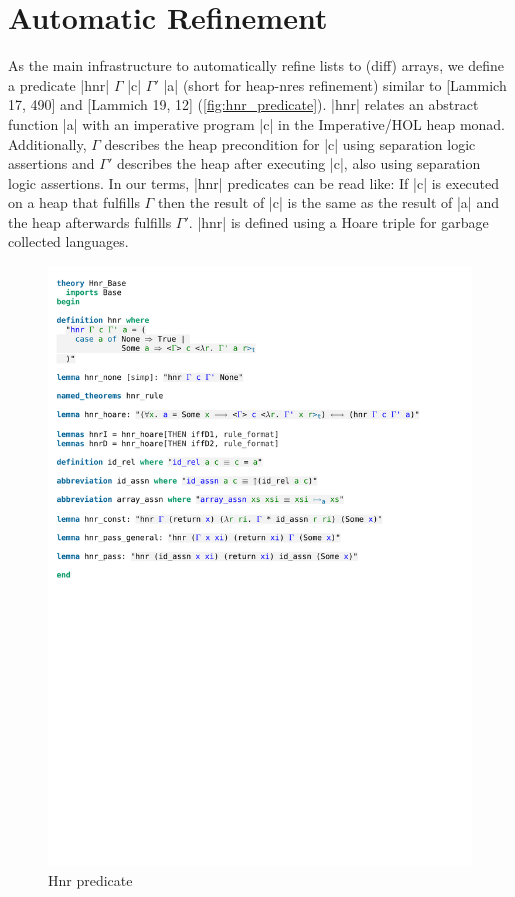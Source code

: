 \chapter{Automatic Refinement}\label{chapter:automatic-refinement}

As the main infrastructure to automatically refine lists to (diff) arrays, we define a predicate |hnr| $\Gamma$ |c| $\Gamma'$ |a| (short for heap-nres refinement) similar to [Lammich 17, 490] and [Lammich 19, 12] (\autoref{fig:hnr_predicate}). |hnr| relates an abstract function |a| with an imperative program |c| in the Imperative/HOL heap monad. Additionally, $\Gamma$ describes the heap precondition for |c| using separation logic assertions and $\Gamma'$ describes the heap after executing |c|, also using separation logic assertions. In our terms, |hnr| predicates can be read like: If |c| is executed on a heap that fulfills $\Gamma$ then the result of |c| is the same as the result of |a| and the heap afterwards fulfills $\Gamma'$. |hnr| is defined using a Hoare triple for garbage collected languages.

\begin{figure}[htpb]
    \includegraphics[trim={0 24,8cm 0 2,4cm}, clip, width=1.00\textwidth]{figures/Theory_Hnr_Base.pdf}
    \caption[Hnr predicate]{Hnr predicate}
    \label{fig:hnr_predicate}
\end{figure}


